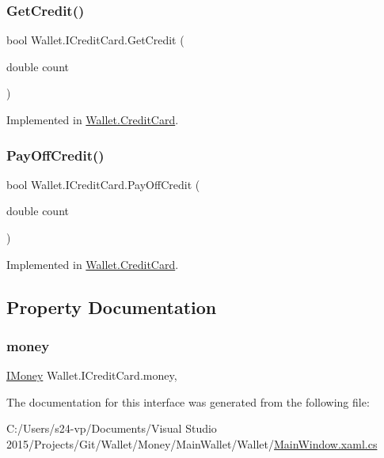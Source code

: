 \subsubsection{\texorpdfstring{Get\+Credit()}{GetCredit()}}
{\footnotesize\ttfamily bool Wallet.\+I\+Credit\+Card.\+Get\+Credit (\begin{DoxyParamCaption}\item[{double}]{count }\end{DoxyParamCaption})}



Implemented in \hyperlink{class_wallet_1_1_credit_card_a8907e7f7d9b2fcdf0fa84f0a76bc2b82}{Wallet.\+Credit\+Card}.

\hypertarget{interface_wallet_1_1_i_credit_card_a8b7eadc0c901e4560f244d28b59e32bf}{}\label{interface_wallet_1_1_i_credit_card_a8b7eadc0c901e4560f244d28b59e32bf} 
\subsubsection{\texorpdfstring{Pay\+Off\+Credit()}{PayOffCredit()}}
{\footnotesize\ttfamily bool Wallet.\+I\+Credit\+Card.\+Pay\+Off\+Credit (\begin{DoxyParamCaption}\item[{double}]{count }\end{DoxyParamCaption})}



Implemented in \hyperlink{class_wallet_1_1_credit_card_a44cebe9c7bd0b962656364d80899b59e}{Wallet.\+Credit\+Card}.



\subsection{Property Documentation}
\hypertarget{interface_wallet_1_1_i_credit_card_a609b2ca54cc81d132755a47442a81c7c}{}\label{interface_wallet_1_1_i_credit_card_a609b2ca54cc81d132755a47442a81c7c} 
\subsubsection{\texorpdfstring{money}{money}}
{\footnotesize\ttfamily \hyperlink{interface_wallet_1_1_i_money}{I\+Money} Wallet.\+I\+Credit\+Card.\+money\hspace{0.3cm}{\ttfamily [get]}, {\ttfamily [set]}}



The documentation for this interface was generated from the following file\+:\begin{DoxyCompactItemize}
\item 
C\+:/\+Users/s24-\/vp/\+Documents/\+Visual Studio 2015/\+Projects/\+Git/\+Wallet/\+Money/\+Main\+Wallet/\+Wallet/\hyperlink{_main_window_8xaml_8cs}{Main\+Window.\+xaml.\+cs}\end{DoxyCompactItemize}
